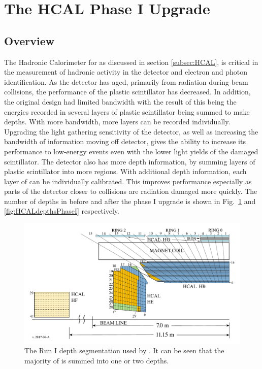 \section{The HCAL Phase I Upgrade}
\subsection{Overview}
The Hadronic Calorimeter for \CMS as discussed in section \ref{subsec:HCAL}, is critical in the measurement of hadronic activity in the detector and electron and photon identification. As the detector has aged, primarily from radiation during beam collisions, the performance of the plastic scintillator has decreased. In addition, the original \HCAL design had limited bandwidth with the result of this being the energies recorded in several layers of plastic scintillator being summed to make depths.  With more bandwidth, more layers can be recorded individually. Upgrading the light gathering sensitivity of the detector, as well as increasing the bandwidth of information moving off detector, gives \HCAL the ability to increase its performance to low-energy events even with the lower light yields of the damaged scintillator.  The detector also has more depth information, by summing layers of plastic scintillator into more regions. With additional depth information, each layer of \HCAL can be individually calibrated. This improves performance especially as parts of the detector closer to collisions are radiation damaged more quickly. The number of depths in \HCAL before and after the phase I upgrade is shown in Fig.~\ref{fig:HCALdepthsRunI} and \ref{fig:HCALdepthsPhaseI} respectively.

\begin{figure}[!tp]
    \centering
    \includegraphics[width=\textwidth]{figures/HCAL-Depth-Segmentation-Legacy-View-HBHEHFHO-v201706A.pdf}
    \caption[
       \HCAL legacy depth segmentation.
    ]{
        The Run I depth segmentation used by \HCAL.  It can be seen that the majority of \HCAL is summed into one or two depths.
    }
    \label{fig:HCALdepthsRunI}
\end{figure}

